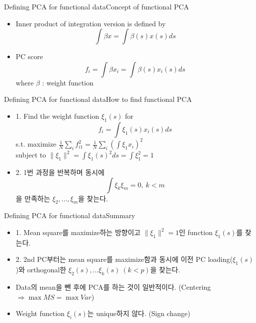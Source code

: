 \documentclass{beamer}
\begin{document}
\begin{frame}{Defining PCA for functional data}{Concept of functional PCA}
\begin{itemize}
	\item {
		Inner product of integration version is defined by
		$$ \int \beta x = \int \beta(s) x(s) ds $$
	}
	\item {
		PC score
		$$ f_i = \int \beta x_i = \int \beta(s) x_i(s) ds $$
		where $\beta$ : weight function
	}
\end{itemize}
\end{frame}

\begin{frame}{Defining PCA for functional data}{How to find functional PCA}
	\begin{itemize}
		\item {
			1. Find the weight function $\xi_1(s)$ for
			$$ f_i = \int \xi_1(s) x_i(s) ds $$
			s.t. maximize $ \frac{1}{N}\sum_i f_{i1}^2 = \frac{1}{N}\sum_i (\int \xi_1 x_i)^2 $ \\
			subject to $ \lVert \xi_1 \rVert^2 =\int \xi_1(s)^2ds = \int \xi_1^2 = 1 $
		}
		\item {
			2. 1번 과정을 반복하며 동시에
			$$ \int \xi_k \xi_m=0, \ k<m $$
			을 만족하는 $ \xi_2,...,\xi_m $을 찾는다.
		}
	\end{itemize}
\end{frame}

\begin{frame}{Defining PCA for functional data}{Summary}
	\begin{itemize}
		\item {
			1. Mean square를 maximize하는 방향이고 $ \lVert \xi_1 \rVert^2=1 $인 function $\xi_1(s) $를 찾는다.
		}
		\item {
			2. 2nd PC부터는 mean square를 maximize함과 동시에 이전 PC loading($ \xi_1(s) $)와 orthogonal한 $ \xi_2(s),...\xi_k(s) \ (k<p) $을 찾는다.
		}
		\item {
			Data의 mean을 뺀 후에 PCA를 하는 것이 일반적이다. (Centering $\Rightarrow \max MS = \max Var $)
		}
		\item {
			Weight function $\xi_i(s)$는 unique하지 않다. (Sign change)
		}
	\end{itemize}
\end{frame}
\end{document}
